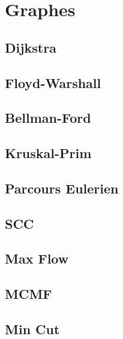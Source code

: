 \documentclass[10pt]{article}
\begin{document}
\tableofcontents\vspace{0.5cm}

\section{Graphes}
\subsection{Dijkstra}
{\scriptsize}

\subsection{Floyd-Warshall}
{\scriptsize}

\subsection{Bellman-Ford}
{\scriptsize}

\subsection{Kruskal-Prim}
{\scriptsize}

\subsection{Parcours Eulerien}
{\scriptsize}

\subsection{SCC}
{\scriptsize}

\subsection{Max Flow}
{\scriptsize}

\subsection{MCMF}
{\scriptsize}

\subsection{Min Cut}
{\scriptsize}
\end{document}
